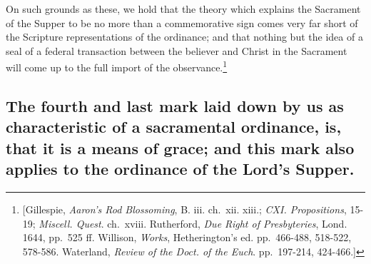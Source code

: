 \documentclass[english,]{book}
\begin{document}
On such grounds as these, we hold that the theory which explains the Sacrament of the Supper to be no more than a commemorative sign comes very far short of the Scripture representations of the ordinance; and that nothing but the idea of a seal of a federal transaction between the believer and Christ in the Sacrament will come up to the full import of the observance.\footnote{{[}Gillespie, \emph{Aaron's Rod Blossoming}, B. iii. ch.~xii. xiii.; \emph{CXI. Propositions}, 15-19; \emph{Miscell. Quest}. ch.~xviii. Rutherford, \emph{Due Right of Presbyteries}, Lond. 1644, pp.~525 ff. Willison, \emph{Works}, Hetherington's ed. pp.~466-488, 518-522, 578-586. Waterland, \emph{Review of the Doct. of the Euch}. pp.~197-214, 424-466.{]}}

\hypertarget{the-fourth-and-last-mark-laid-down-by-us-as-characteristic-of-a-sacramental-ordinance-is-that-it-is-a-means-of-grace-and-this-mark-also-applies-to-the-ordinance-of-the-lords-supper.}{%
\subsection{The fourth and last mark laid down by us as characteristic of a sacramental ordinance, is, that it is a means of grace; and this mark also applies to the ordinance of the Lord's Supper.}\label{the-fourth-and-last-mark-laid-down-by-us-as-characteristic-of-a-sacramental-ordinance-is-that-it-is-a-means-of-grace-and-this-mark-also-applies-to-the-ordinance-of-the-lords-supper.}}
\end{document}
